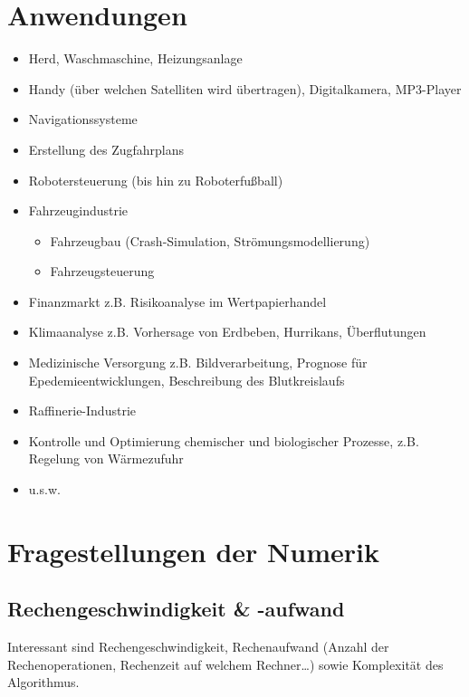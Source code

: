 \section*{Anwendungen}
\begin{itemize}
\item Herd, Waschmaschine, Heizungsanlage
\item Handy (über welchen Satelliten wird übertragen),
  Digitalkamera, MP3-Player
\item Navigationssysteme
\item Erstellung des Zugfahrplans
\item Robotersteuerung (bis hin zu Roboterfußball)
\item Fahrzeugindustrie
  \begin{itemize}
  \item Fahrzeugbau (Crash-Simulation,
    Strömungsmodellierung)
  \item Fahrzeugsteuerung
  \end{itemize}
\item Finanzmarkt z.B. Risikoanalyse im Wertpapierhandel
\item Klimaanalyse z.B. Vorhersage von Erdbeben, Hurrikans,
  Überflutungen
\item Medizinische Versorgung z.B. Bildverarbeitung, Prognose
  für Epedemieentwicklungen, Beschreibung des Blutkreislaufs
\item Raffinerie-Industrie
\item Kontrolle und Optimierung chemischer und biologischer
  Prozesse, z.B. Regelung von Wärmezufuhr
\item u.s.w.
\end{itemize}

\section*{Fragestellungen der Numerik}
\subsection*{Rechengeschwindigkeit \& -aufwand}
Interessant sind Rechengeschwindigkeit, Rechenaufwand 
(Anzahl der Rechenoperationen, Rechenzeit auf welchem Rechner…)
sowie Komplexität des Algorithmus.

